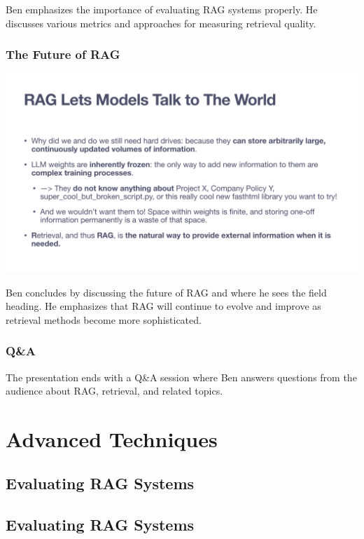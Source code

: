 \documentclass[
  letterpaper,
  oneside]{scrbook}
\begin{document}
Ben emphasizes the importance of evaluating RAG systems properly. He
discusses various metrics and approaches for measuring retrieval
quality.

\section{The Future of RAG}\label{the-future-of-rag-1}

\includegraphics{chapters/../p1-images/slide_11.png}

Ben concludes by discussing the future of RAG and where he sees the
field heading. He emphasizes that RAG will continue to evolve and
improve as retrieval methods become more sophisticated.

\section{Q\&A}\label{qa}

The presentation ends with a Q\&A session where Ben answers questions
from the audience about RAG, retrieval, and related topics.

\part{Advanced Techniques}

\chapter{Evaluating RAG Systems}\label{evaluating-rag-systems-1}

\chapter{Evaluating RAG Systems}\label{evaluating-rag-systems-2}
\end{document}
